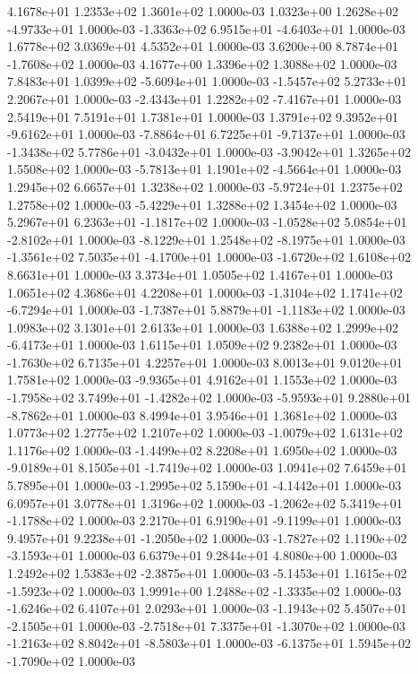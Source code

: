 4.1678e+01 1.2353e+02 1.3601e+02  1.0000e-03
 1.0323e+00  1.2628e+02 -4.9733e+01  1.0000e-03
-1.3363e+02  6.9515e+01 -4.6403e+01  1.0000e-03
1.6778e+02 3.0369e+01 4.5352e+01  1.0000e-03
 3.6200e+00  8.7874e+01 -1.7608e+02  1.0000e-03
4.1677e+00 1.3396e+02 1.3088e+02  1.0000e-03
 7.8483e+01  1.0399e+02 -5.6094e+01  1.0000e-03
-1.5457e+02  5.2733e+01  2.2067e+01  1.0000e-03
-2.4343e+01  1.2282e+02 -7.4167e+01  1.0000e-03
2.5419e+01 7.5191e+01 1.7381e+01  1.0000e-03
 1.3791e+02  9.3952e+01 -9.6162e+01  1.0000e-03
-7.8864e+01  6.7225e+01 -9.7137e+01  1.0000e-03
-1.3438e+02  5.7786e+01 -3.0432e+01  1.0000e-03
-3.9042e+01  1.3265e+02  1.5508e+02  1.0000e-03
-5.7813e+01  1.1901e+02 -4.5664e+01  1.0000e-03
1.2945e+02 6.6657e+01 1.3238e+02  1.0000e-03
-5.9724e+01  1.2375e+02  1.2758e+02  1.0000e-03
-5.4229e+01  1.3288e+02  1.3454e+02  1.0000e-03
 5.2967e+01  6.2363e+01 -1.1817e+02  1.0000e-03
-1.0528e+02  5.0854e+01 -2.8102e+01  1.0000e-03
-8.1229e+01  1.2548e+02 -8.1975e+01  1.0000e-03
-1.3561e+02  7.5035e+01 -4.1700e+01  1.0000e-03
-1.6720e+02  1.6108e+02  8.6631e+01  1.0000e-03
3.3734e+01 1.0505e+02 1.4167e+01  1.0000e-03
1.0651e+02 4.3686e+01 4.2208e+01  1.0000e-03
-1.3104e+02  1.1741e+02 -6.7294e+01  1.0000e-03
-1.7387e+01  5.8879e+01 -1.1183e+02  1.0000e-03
1.0983e+02 3.1301e+01 2.6133e+01  1.0000e-03
 1.6388e+02  1.2999e+02 -6.4173e+01  1.0000e-03
1.6115e+01 1.0509e+02 9.2382e+01  1.0000e-03
-1.7630e+02  6.7135e+01  4.2257e+01  1.0000e-03
8.0013e+01 9.0120e+01 1.7581e+02  1.0000e-03
-9.9365e+01  4.9162e+01  1.1553e+02  1.0000e-03
-1.7958e+02  3.7499e+01 -1.4282e+02  1.0000e-03
-5.9593e+01  9.2880e+01 -8.7862e+01  1.0000e-03
8.4994e+01 3.9546e+01 1.3681e+02  1.0000e-03
1.0773e+02 1.2775e+02 1.2107e+02  1.0000e-03
-1.0079e+02  1.6131e+02  1.1176e+02  1.0000e-03
-1.4499e+02  8.2208e+01  1.6950e+02  1.0000e-03
-9.0189e+01  8.1505e+01 -1.7419e+02  1.0000e-03
1.0941e+02 7.6459e+01 5.7895e+01  1.0000e-03
-1.2995e+02  5.1590e+01 -4.1442e+01  1.0000e-03
6.0957e+01 3.0778e+01 1.3196e+02  1.0000e-03
-1.2062e+02  5.3419e+01 -1.1788e+02  1.0000e-03
 2.2170e+01  6.9190e+01 -9.1199e+01  1.0000e-03
 9.4957e+01  9.2238e+01 -1.2050e+02  1.0000e-03
-1.7827e+02  1.1190e+02 -3.1593e+01  1.0000e-03
6.6379e+01 9.2844e+01 4.8080e+00  1.0000e-03
 1.2492e+02  1.5383e+02 -2.3875e+01  1.0000e-03
-5.1453e+01  1.1615e+02 -1.5923e+02  1.0000e-03
 1.9991e+00  1.2488e+02 -1.3335e+02  1.0000e-03
-1.6246e+02  6.4107e+01  2.0293e+01  1.0000e-03
-1.1943e+02  5.4507e+01 -2.1505e+01  1.0000e-03
-2.7518e+01  7.3375e+01 -1.3070e+02  1.0000e-03
-1.2163e+02  8.8042e+01 -8.5803e+01  1.0000e-03
-6.1375e+01  1.5945e+02 -1.7090e+02  1.0000e-03

